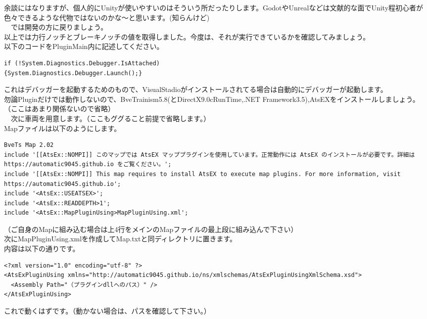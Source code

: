 \documentclass[b5paper,9pt,platex,dvipdfmx]{jsarticle}
\begin{document}
\begin{multicols*}{3}
余談にはなりますが、個人的にUnityが使いやすいのはそういう所だったりします。GodotやUnrealなどは文献的な面でUnity程初心者が色々できるような代物ではないのかな～と思います。(知らんけど)\\
　では開発の方に戻りましょう。\\
以上では力行ノッチとブレーキノッチの値を取得しました。今度は、それが実行できているかを確認してみましょう。\\
以下のコードをPluginMain内に記述してください。\\
\begin{lstlisting}[caption= MapPluginMain()]
if (!System.Diagnostics.Debugger.IsAttached)
{System.Diagnostics.Debugger.Launch();}
\end{lstlisting}
これはデバッガーを起動するためのもので、VisualStadioがインストールされてる場合は自動的にデバッガーが起動します。\\
勿論Pluginだけでは動作しないので、BveTrainism5.8(とDirectX9.0cRunTime,.NET Framework3.5),AtsEXをインストールしましょう。（ここはあまり関係ないので省略）\\
　次に車両を用意します。（ここもググること前提で省略します。）\\
Mapファイルは以下のようにします。\\
\begin{lstlisting}[caption= Map.txt]
BveTs Map 2.02
include '[[AtsEx::NOMPI]] このマップでは AtsEX マッププラグインを使用しています。正常動作には AtsEX のインストールが必要です。詳細は https://automatic9045.github.io をご覧ください。';
include '[[AtsEx::NOMPI]] This map requires to install AtsEX to execute map plugins. For more information, visit https://automatic9045.github.io';
include '<AtsEx::USEATSEX>';
include '<AtsEx::READDEPTH>1';
include '<AtsEx::MapPluginUsing>MapPluginUsing.xml';
\end{lstlisting}
（ご自身のMapに組み込む場合は上4行をメインのMapファイルの最上段に組み込んで下さい）\\
次にMapPluginUsing.xmlを作成してMap.txtと同ディレクトリに置きます。\\
内容は以下の通りです。\\
\begin{lstlisting}[caption= MapPluginUsing.xml]
<?xml version="1.0" encoding="utf-8" ?>
<AtsExPluginUsing xmlns="http://automatic9045.github.io/ns/xmlschemas/AtsExPluginUsingXmlSchema.xsd">
  <Assembly Path="（プラグインdllへのパス）" />
</AtsExPluginUsing>
\end{lstlisting}
これで動くはずです。（動かない場合は、パスを確認して下さい。）\\

\end{multicols*}
\end{document}
